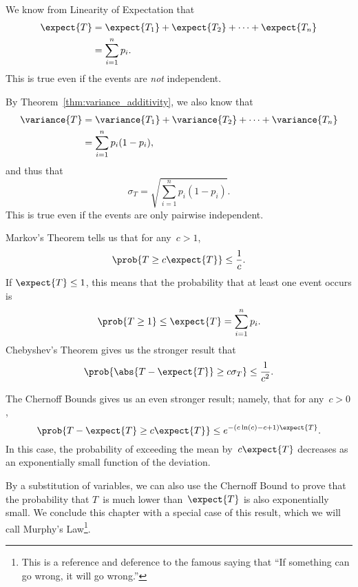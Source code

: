 We know from Linearity of Expectation that
\begin{align*}
\expect{T}
    &= \expect{T_1} + \expect{T_2} + \dots + \expect{T_n} \\
    &= \sum_{i = 1}^n p_i.
\end{align*}
This is true even if the events are \emph{not} independent.

By Theorem~\ref{thm:variance_additivity}, we also know that
\begin{align*}
\variance{T}
     &= \variance{T_1} + \variance{T_2} + \dots + \variance{T_n} \\
     &= \sum_{i = 1}^n p_i (1 - p_i),
\end{align*}
and thus that
\begin{equation*}
    \sigma_T = \sqrt{ \sum_{i = 1}^n p_i (1 - p_i) }.
\end{equation*}
This is true even if the events are only pairwise independent.

Markov's Theorem tells us that for any~$c > 1$,
\begin{equation*}
    \prob{ T \ge c \expect{T} } \le \frac{1}{c}.
\end{equation*}
If $\expect{T} \le 1$, this means that the probability that at least
one event occurs is
\begin{equation*}
\prob{T \ge 1}
    \le \expect{T}
    =   \sum_{i = 1}^n p_i.
\end{equation*}
Chebyshev's Theorem gives us the stronger result that
\begin{equation*}
    \prob{ \abs{T - \expect{T}} \ge c \sigma_T } \le \frac{1}{c^2}.
\end{equation*}

The Chernoff Bounds gives us an even stronger result; namely, that for
any~$c > 0$,
\begin{equation*}
\prob{T - \expect{T} \ge c \expect{T}}
    \le e^{-(c \ln(c) - c + 1) \expect{T}}.
\end{equation*}
In this case, the probability of exceeding the mean by~$c \expect{T}$
decreases as an exponentially small function of the deviation.

By a substitution of variables, we can also use the Chernoff Bound to
prove that the probability that $T$~is much lower than~$\expect{T}$ is
also exponentially small.  We conclude this chapter with a special
case of this result, which we will call Murphy's Law\footnote{This is
  a reference and deference to the famous saying that ``If something
  can go wrong, it will go wrong.''}.

